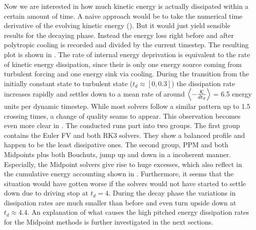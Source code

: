  Now we
are interested in how much kinetic energy is actually dissipated within a
certain amount of time. A naive approach would be to take the numerical time
derivative of the evolving kinetic energy
(). But it would just yield
sensible results for the decaying phase. Instead the energy loss right before
and after polytropic cooling is recorded and divided by the current timestep.
The resulting plot is shown in
.  The rate of internal
energy deprivation is equivalent to the rate of kinetic energy dissipation,
since their is only one energy source coming from turbulent forcing and one
energy sink via cooling. During the transition from the initially constant
state to turbulent state ($t_d \approx [0,0.3]$) the dissipation rate increases
rapidly and settles down to a mean rate of around $\left\langle-\frac{\mathcal{K}}{dt_d}\right\rangle$ = 6.5
energy units per dynamic timestep. While most solvers follow a similar pattern
up to 1.5 crossing times, a change of quality seams to appear. This observation
becomes even more clear in .  The
conducted runs part into two groups. The first group contains the Euler FV and
both RK3 solvers. They show a balanced profile and happen to be the least
dissipative ones. The second group, PPM and both Midpoints plus both Bouchuts,
jump up and down in a incoherent manner. Especially, the Midpoint solvers give rise
to huge excesses, which also reflect in the cumulative energy accounting shown
in . Furthermore,
it seems that the situation would have gotten worse if the solvers would not
have started to settle down due to driving stop at $t_d = 4$. During the decay
phase the variations in dissipation rates are much smaller than before and even
turn upside down at $t_d \approx 4.4$. An explanation of what causes the high
pitched energy dissipation rates for the Midpoint methods is further
investigated in the next sections.


